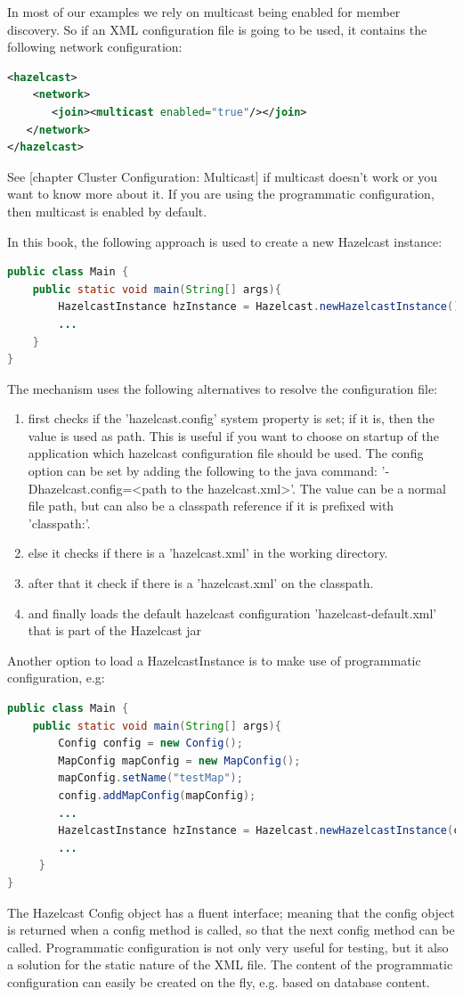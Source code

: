 In most of our examples we rely on multicast being enabled for member discovery. So if an XML configuration file is going to be used, it contains the following network configuration:
\begin{lstlisting}[language=xml]
<hazelcast>
    <network>
       <join><multicast enabled="true"/></join>
   </network>
</hazelcast>
\end{lstlisting}
See [chapter Cluster Configuration: Multicast] if multicast doesn't work or you want to know more about it. If you are using the programmatic configuration, then multicast is enabled by default.

In this book, the following approach is used to create a new Hazelcast instance:
\begin{lstlisting}[language=java]
public class Main {
    public static void main(String[] args){
        HazelcastInstance hzInstance = Hazelcast.newHazelcastInstance();
        ...
    }
}
\end{lstlisting}
The mechanism uses the following alternatives to resolve the configuration file:
\begin{enumerate}
\item first checks if the 'hazelcast.config' system property is set; if it is, then the value is used as path. This is useful if you want to choose on startup of the application which hazelcast configuration file should be used. The config option can be set by adding the following to the java command: '-Dhazelcast.config=<path to the hazelcast.xml>'. The value can be a normal file path, but can also be a classpath reference if it is prefixed with 'classpath:'. 
\item else it checks if there is a 'hazelcast.xml' in the working directory.
\item after that it check if there is a 'hazelcast.xml' on the classpath. 
\item and finally loads the default hazelcast configuration 'hazelcast-default.xml' that is part of the Hazelcast jar
\end{enumerate}

Another option to load a HazelcastInstance is to make use of programmatic configuration, e.g: 
\begin{lstlisting}[language=java]
public class Main {
    public static void main(String[] args){
        Config config = new Config();
        MapConfig mapConfig = new MapConfig();
        mapConfig.setName("testMap");
        config.addMapConfig(mapConfig);
        ...
        HazelcastInstance hzInstance = Hazelcast.newHazelcastInstance(config);
        ...
     }
}
\end{lstlisting}
The Hazelcast Config object has a fluent interface; meaning that the config object is returned when a config method is called, so that the next config method can be called. Programmatic configuration is not only very useful for testing, but it also a solution for the static nature of the XML file. The content of the programmatic configuration can easily be created on the fly, e.g. based on database content. 

